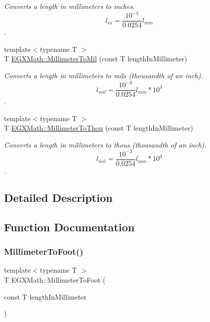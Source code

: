\begin{DoxyCompactItemize}
\begin{DoxyCompactList}\small\item\em Converts a length in millimeters to inches. \[ l_{in}= \frac{10^{-3}}{0.0254} l_{mm} \]. \end{DoxyCompactList}\item 
{\footnotesize template$<$typename T $>$ }\\T \mbox{\hyperlink{group___e_g_x_math-_conversions-_length_conversions-_millimeter-_imperial_gaf811317f4ce575df4ff0329491e92fac}{E\+G\+X\+Math\+::\+Millimeter\+To\+Mil}} (const T length\+In\+Millimeter)
\begin{DoxyCompactList}\small\item\em Converts a length in millimeters to mils (thousandth of an inch). \[ l_{mil}= \frac{10^{-3}}{0.0254} l_{mm} * 10^{3} \]. \end{DoxyCompactList}\item 
{\footnotesize template$<$typename T $>$ }\\T \mbox{\hyperlink{group___e_g_x_math-_conversions-_length_conversions-_millimeter-_imperial_ga099bde3b0f85fbbfbe91f0162a392835}{E\+G\+X\+Math\+::\+Millimeter\+To\+Thou}} (const T length\+In\+Millimeter)
\begin{DoxyCompactList}\small\item\em Converts a length in millimeters to thous (thousandth of an inch). \[ l_{mil}= \frac{10^{-3}}{0.0254} l_{mm} * 10^{3} \]. \end{DoxyCompactList}\end{DoxyCompactItemize}


\subsection{Detailed Description}


\subsection{Function Documentation}
\mbox{\label{group___e_g_x_math-_conversions-_length_conversions-_millimeter-_imperial_ga96513545d32f8e86044a3a3551840023}} 
\subsubsection{\texorpdfstring{Millimeter\+To\+Foot()}{MillimeterToFoot()}}
{\footnotesize\ttfamily template$<$typename T $>$ \\
T E\+G\+X\+Math\+::\+Millimeter\+To\+Foot (\begin{DoxyParamCaption}\item[{const T}]{length\+In\+Millimeter }\end{DoxyParamCaption})}



